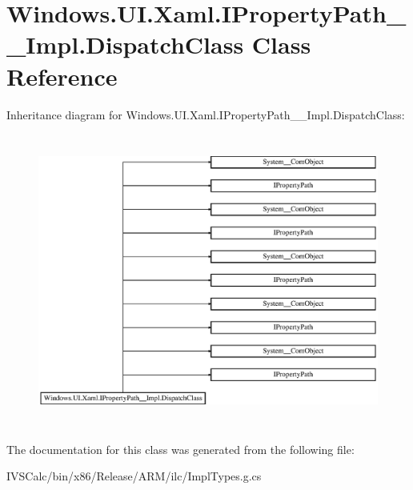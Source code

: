 \hypertarget{class_windows_1_1_u_i_1_1_xaml_1_1_i_property_path_____impl_1_1_dispatch_class}{}\section{Windows.\+U\+I.\+Xaml.\+I\+Property\+Path\+\_\+\+\_\+\+Impl.\+Dispatch\+Class Class Reference}
\label{class_windows_1_1_u_i_1_1_xaml_1_1_i_property_path_____impl_1_1_dispatch_class}
Inheritance diagram for Windows.\+U\+I.\+Xaml.\+I\+Property\+Path\+\_\+\+\_\+\+Impl.\+Dispatch\+Class\+:\begin{figure}[H]
\begin{center}
\leavevmode
\includegraphics[height=9.685535cm]{class_windows_1_1_u_i_1_1_xaml_1_1_i_property_path_____impl_1_1_dispatch_class}
\end{center}
\end{figure}


The documentation for this class was generated from the following file\+:\begin{DoxyCompactItemize}
\item 
I\+V\+S\+Calc/bin/x86/\+Release/\+A\+R\+M/ilc/Impl\+Types.\+g.\+cs\end{DoxyCompactItemize}
